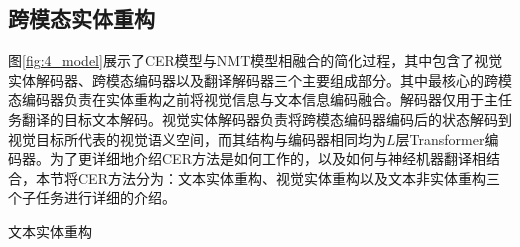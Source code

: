 

\subsection{跨模态实体重构}
\label{sec:4_cer}

图\ref{fig:4_model}展示了CER模型与NMT模型相融合的简化过程，其中包含了视觉实体解码器、跨模态编码器以及翻译解码器三个主要组成部分。其中最核心的跨模态编码器负责在实体重构之前将视觉信息与文本信息编码融合。解码器仅用于主任务翻译的目标文本解码。视觉实体解码器负责将跨模态编码器编码后的状态解码到视觉目标所代表的视觉语义空间，而其结构与编码器相同均为$L$层Transformer编码器。为了更详细地介绍CER方法是如何工作的，以及如何与神经机器翻译相结合，本节将CER方法分为：文本实体重构、视觉实体重构以及文本非实体重构三个子任务进行详细的介绍。

{\sffamily 文本实体重构}

